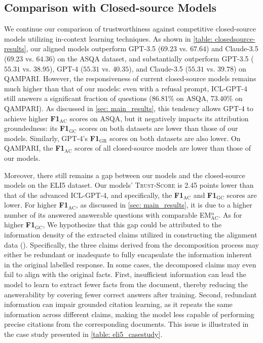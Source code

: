 \documentclass{article} %
\newcommand{\metric}[0]{\textsc{Trust-Score}}
\begin{document}
\subsection{Comparison with Closed-source Models} \label{sec:appComparison with closed-source models}
We continue our comparison of trustworthiness against competitive closed-source models utilizing in-context learning techniques. As shown in \cref{table: closedsource-results}, our aligned models outperform GPT-3.5 ($69.23$ vs. $67.64$) and Claude-3.5 ($69.23$ vs. $64.36$) on the ASQA dataset, and substantially outperform GPT-3.5 ($55.31$ vs. $38.95$), GPT-4 ($55.31$ vs. $40.35$), and Claude-3.5 ($55.31$ vs. $39.78$) on QAMPARI. However, the responsiveness of current closed-source models remains much higher than that of our models: even with a refusal prompt, ICL-GPT-4 still answers a significant fraction of questions (86.81\% on ASQA, 73.40\% on QAMPARI). As discussed in \cref{sec: main_results}, this tendency allows GPT-4 to achieve higher \textbf{F1$_{\text{AC}}$} scores on ASQA, but it negatively impacts its attribution groundedness: its \textbf{F1$_{\text{GC}}$} scores on both datasets are lower than those of our models. Similarly, GPT-4's \textbf{F1$_{\text{GR}}$} scores on both datasets are also lower. On QAMPARI, the \textbf{F1$_{\text{AC}}$} scores of all closed-source models are lower than those of our models.

Moreover, there still remains a gap between our models and the closed-source models on the ELI5 dataset. Our models' \metric{} is 2.45 points lower than that of the advanced ICL-GPT-4, and specifically, the \textbf{F1$_{\text{AC}}$} and \textbf{F1$_{\text{GC}}$} scores are lower. For higher \textbf{F1$_{\text{AC}}$}, as discussed in \cref{sec: main_results}, it is due to a higher number of its answered answerable questions with comparable EM$^{\alpha}_{\text{AC}}$. As for higher \textbf{F1$_{\text{GC}}$}, We hypothesize that this gap could be attributed to the information density of the extracted claims utilized in constructing the alignment data (). Specifically, the three claims derived from the decomposition process may either be redundant or inadequate to fully encapsulate the information inherent in the original labelled response. In some cases, the decomposed claims may even fail to align with the original facts. First, insufficient information can lead the model to learn to extract fewer facts from the document, thereby reducing the answerability by covering fewer correct answers after training. Second, redundant information can impair grounded citation learning, as it repeats the same information across different claims, making the model less capable of performing precise citations from the corresponding documents. This issue is illustrated in the case study presented in \cref{table: eli5_casestudy}.
\end{document}
